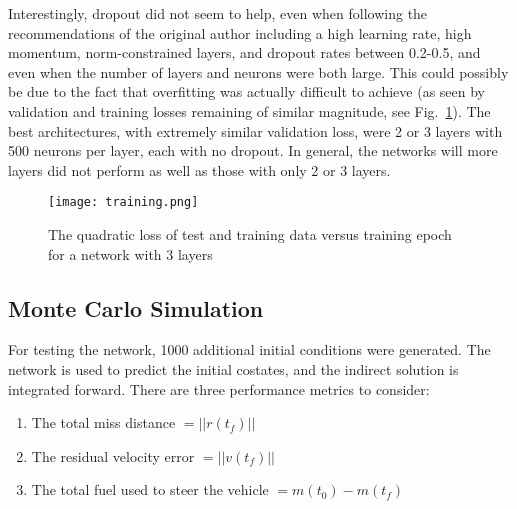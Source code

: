 \documentclass[10pt,a4paper]{article}
\begin{document}
Interestingly, dropout did not seem to help, even when following the recommendations of the original author including a high learning rate, high momentum, norm-constrained layers, and dropout rates between 0.2-0.5, \cite{dropout} and even when the number of layers and neurons were both large. This could possibly be due to the fact that overfitting was actually difficult to achieve (as seen by validation and training losses remaining of similar magnitude, see Fig.~\ref{graph_training}). The best architectures, with extremely similar validation loss, were 2 or 3 layers with 500 neurons per layer, each with no dropout. In general, the networks will more layers did not perform as well as those with only 2 or 3 layers. 
\begin{figure}
\caption{The quadratic loss of test and training data versus training epoch for a network with 3 layers }
\begin{center}
\texttt{[image: training.png]} \label{graph_training}
\end{center}
\end{figure}
%
%

\subsection{Monte Carlo Simulation}
For testing the network, 1000 additional initial conditions were generated. The network is used to predict the initial costates, and the indirect solution is integrated forward. There are three performance metrics to consider:
\begin{enumerate}
\item The total miss distance $ = ||r(t_f)||$
\item The residual velocity error $ = ||v(t_f)||$
\item The total fuel used to steer the vehicle $ = m(t_0)-m(t_f) $
\end{enumerate}
\end{document}
